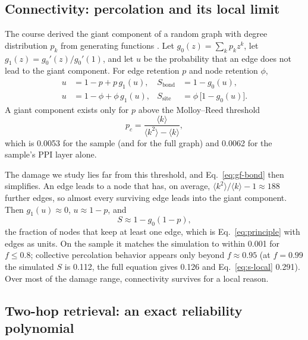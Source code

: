 \subsection{Connectivity: percolation and its local limit}
\label{sec:theory-gf}

The course derived the giant component of a random graph with degree
distribution $p_k$ from generating functions \cite{newman2001random}. Let
$g_0(z)=\sum_k p_k z^k$, let $g_1(z)=g_0'(z)/g_0'(1)$, and let $u$ be the
probability that an edge does not lead to the giant component. For edge
retention $p$ and node retention $\phi$,
\begin{align}
u&=1-p+p\,g_1(u), & S_{\mathrm{bond}}&=1-g_0(u), \label{eq:gf-bond}\\
u&=1-\phi+\phi\,g_1(u), & S_{\mathrm{site}}&=\phi\,\bigl[1-g_0(u)\bigr]. \label{eq:gf-site}
\end{align}
A giant component exists only for $p$ above the Molloy--Reed threshold
\cite{molloy1995critical}
\begin{equation}
p_c=\frac{\langle k\rangle}{\langle k^2\rangle-\langle k\rangle},
\label{eq:pc}
\end{equation}
which is 0.0053 for the sample (and for the full graph) and 0.0062 for the sample's PPI layer alone.

The damage we study lies far from this threshold, and Eq.~\eqref{eq:gf-bond}
then simplifies. An edge leads to a node that has, on average, $\langle k^2\rangle/\langle k\rangle-1\approx188$ further edges, so almost every surviving edge leads into the giant component. Then $g_1(u)\approx0$, $u\approx1-p$, and
\begin{equation}
S\approx1-g_0(1-p),
\label{eq:s-local}
\end{equation}
the fraction of nodes that keep at least one edge, which is
Eq.~\eqref{eq:principle} with edges as units. On the sample it matches the
simulation to within 0.001 for $f\le0.8$; collective percolation behavior
appears only beyond $f\approx0.95$ (at $f=0.99$ the simulated $S$ is 0.112, the
full equation gives 0.126 and Eq.~\eqref{eq:s-local} 0.291). Over most of the
damage range, connectivity survives for a local reason.

\subsection{Two-hop retrieval: an exact reliability polynomial}
\label{sec:theory-r2}

